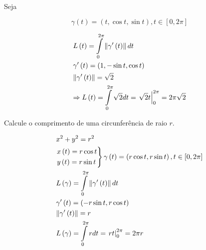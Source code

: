 \documentclass{book}
\begin{document}
\begin{ex}
Seja

\[
    \gamma \left( t \right) = \left( {t,\cos t,\sin t} \right),t \in \left[ {0,2\pi } \right]
\]

\end{ex}

\begin{sol}
\[
\begin{gathered}
  L\left( t \right) = \int\limits_0^{2\pi } {\left\| {\gamma '\left( t \right)} \right\|dt}  \hfill \\
\gamma '\left( t \right) = \left( {1, - \sin t,\cos t} \right) \hfill \\
\left\| {\gamma '\left( t \right)} \right\| = \sqrt 2  \hfill \\
   \Rightarrow L\left( t \right) = \int\limits_0^{2\pi } {\sqrt 2 dt}  = \left. {\sqrt 2 t} \right|_0^{2\pi }  = 2\pi \sqrt 2  \hfill \\
\end{gathered}
\]

\end{sol}

\newpage 

\begin{ex}
Calcule o comprimento de uma circunfer\^encia de raio $r$.

\end{ex}

\begin{sol}
\[
\begin{gathered}
x^2  + y^2  = r^2  \hfill \\
\left. \begin{gathered}
x\left( t \right) = r\cos t \hfill \\
y\left( t \right) = r\sin t \hfill \\
\end{gathered}  \right\}\gamma \left( t \right) = \left( {r\cos t,r\sin t} \right),t \in \left[ {0,2\pi } \right] \hfill \\
  L\left( \gamma  \right) = \int\limits_0^{2\pi } {\left\| {\gamma '\left( t \right)} \right\|dt}  \hfill \\
\gamma '\left( t \right) = \left( { - r\sin t,r\cos t} \right) \hfill \\
\left\| {\gamma '\left( t \right)} \right\| = r \hfill \\
  L\left( \gamma  \right) = \int\limits_0^{2\pi } {rdt}  = \left. {rt} \right|_0^{2\pi }  = 2\pi r \hfill \\
\end{gathered}
\]

\end{sol}
\end{document}
